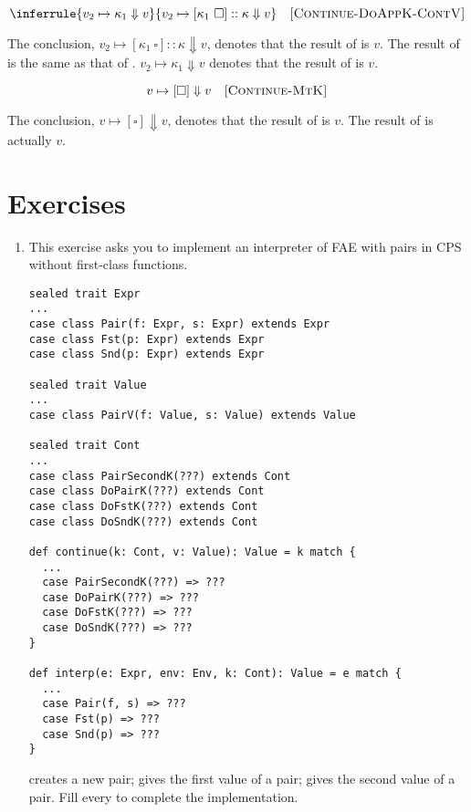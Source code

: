 \[
  \inferrule
  { v_2\mapsto\kappa_1\Downarrow v }
  { v_2\mapsto[\kappa_1\ \square]::\kappa\Downarrow v }
  \quad\textsc{[Continue-DoAppK-ContV]}
\]

The conclusion, $v_2\mapsto[\kappa_1\ \square]::\kappa\Downarrow v$, denotes that
the result of 
is $v$. The result of  is the same as that of .
$v_2\mapsto\kappa_1\Downarrow v$ denotes that the result of
 is $v$.

\[
  v\mapsto[\square]\Downarrow v
  \quad\textsc{[Continue-MtK]}
\]

The conclusion, $v\mapsto[\square]\Downarrow v$, denotes that the result of
 is $v$. The result of  is
actually $v$.

\section{Exercises}

\begin{enumerate}

\item This exercise asks you to implement an interpreter of \textsf{FAE}
    with pairs in CPS without first-class functions.

\begin{verbatim}
sealed trait Expr
...
case class Pair(f: Expr, s: Expr) extends Expr
case class Fst(p: Expr) extends Expr
case class Snd(p: Expr) extends Expr

sealed trait Value
...
case class PairV(f: Value, s: Value) extends Value

sealed trait Cont
...
case class PairSecondK(???) extends Cont
case class DoPairK(???) extends Cont
case class DoFstK(???) extends Cont
case class DoSndK(???) extends Cont

def continue(k: Cont, v: Value): Value = k match {
  ...
  case PairSecondK(???) => ???
  case DoPairK(???) => ???
  case DoFstK(???) => ???
  case DoSndK(???) => ???
}

def interp(e: Expr, env: Env, k: Cont): Value = e match {
  ...
  case Pair(f, s) => ???
  case Fst(p) => ???
  case Snd(p) => ???
}
\end{verbatim}

 creates a new pair;  gives the first value of a
pair;  gives the second value of a pair.  Fill every 
to complete the implementation.

\end{enumerate}
